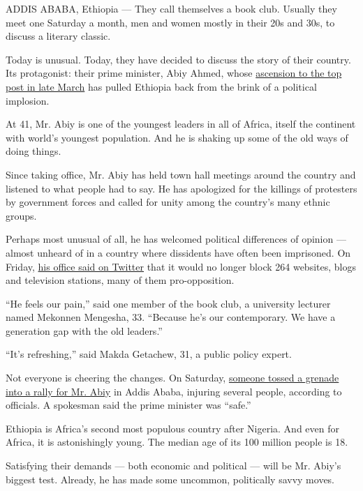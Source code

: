 ADDIS ABABA, Ethiopia --- They call themselves a book club. Usually they
meet one Saturday a month, men and women mostly in their 20s and 30s, to
discuss a literary classic.

Today is unusual. Today, they have decided to discuss the story of their
country. Its protagonist: their prime minister, Abiy Ahmed, whose
\href{https://www.nytimes3xbfgragh.onion/2018/03/28/world/africa/ethiopia-prime-minister-oromo.html?action=click\&module=RelatedCoverage\&pgtype=Article\&region=Footer}{ascension
to the top post in late March} has pulled Ethiopia back from the brink
of a political implosion.

At 41, Mr. Abiy is one of the youngest leaders in all of Africa, itself
the continent with world's youngest population. And he is shaking up
some of the old ways of doing things.

Since taking office, Mr. Abiy has held town hall meetings around the
country and listened to what people had to say. He has apologized for
the killings of protesters by government forces and called for unity
among the country's many ethnic groups.

Perhaps most unusual of all, he has welcomed political differences of
opinion --- almost unheard of in a country where dissidents have often
been imprisoned. On Friday,
\href{https://twitter.com/fitsumaregaa/status/1010095287254372353}{his
office said on Twitter} that it would no longer block 264 websites,
blogs and television stations, many of them pro-opposition.

``He feels our pain,'' said one member of the book club, a university
lecturer named Mekonnen Mengesha, 33. ``Because he's our contemporary.
We have a generation gap with the old leaders.''

``It's refreshing,'' said Makda Getachew, 31, a public policy expert.

Not everyone is cheering the changes. On Saturday,
\href{https://www.nytimes3xbfgragh.onion/2018/06/23/world/africa/ethiopia-explosion-abiy.html}{someone
tossed a grenade into a rally for Mr. Abiy} in Addis Ababa, injuring
several people, according to officials. A spokesman said the prime
minister was ``safe.''

Ethiopia is Africa's second most populous country after Nigeria. And
even for Africa, it is astonishingly young. The median age of its 100
million people is 18.

Satisfying their demands --- both economic and political --- will be Mr.
Abiy's biggest test. Already, he has made some uncommon, politically
savvy moves.


